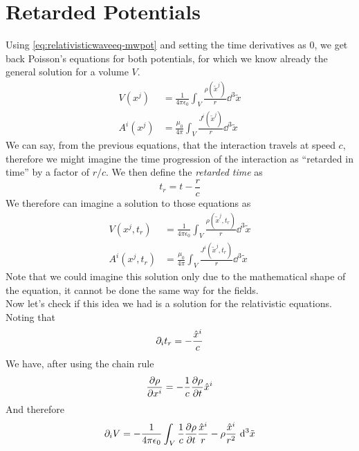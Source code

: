 \documentclass[../electromagnetism.tex]{subfiles}
\begin{document}
\section{Retarded Potentials}
Using \eqref{eq:relativisticwaveeq-mwpot} and setting the time derivatives as 0, we get back Poisson's equations for both potentials, for which we know already the general solution for a volume $V$.
\begin{equation*}
	\begin{aligned}
		V(x^j)&=\frac{1}{4\pi\epsilon_0}\int_{V}^{}\frac{\rho(\tilde{x}^j)}{r}\dd^3{\tilde{x}}\\
		A^i(x^j)&=\frac{\mu_0}{4\pi}\int_{V}^{}\frac{J^i(\tilde{x}^j)}{r}\dd^3{\tilde{x}}
	\end{aligned}
\end{equation*}
We can say, from the previous equations, that the interaction travels at speed $c$, therefore we might imagine the time progression of the interaction as ``retarded in time'' by a factor of $r/c$. We then define the \textit{retarded time} as
\begin{equation}
	t_r=t-\frac{r}{c}
	\label{eq:retardedtime}
\end{equation}
We therefore can imagine a solution to those equations as 
\begin{equation}
	\begin{aligned}
		V(x^j,t_r)&=\frac{1}{4\pi\epsilon_0}\int_{V}^{}\frac{\rho(\tilde{x}^j,t_r)}{r}\dd^3{\tilde{x}}\\
		A^i(x^j,t_r)&=\frac{\mu_0}{4\pi}\int_{V}^{}\frac{J^i(\tilde{x}^j,t_r)}{r}\dd^3{\tilde{x}}
	\end{aligned}
	\label{eq:retardedsolution}
\end{equation}
Note that we could imagine this solution only due to the mathematical shape of the equation, it cannot be done the same way for the fields.\\
Now let's check if this idea we had is a solution for the relativistic equations. Noting that
\begin{equation*}
	\partial_it_r=-\frac{\hat{x}^i}{c}
\end{equation*}
We have, after using the chain rule
\begin{equation*}
	\pdv{\rho}{x^i}=-\frac{1}{c}\pdv{\rho}{t}\hat{x}^i
\end{equation*}
And therefore
\begin{equation*}
	\partial_iV=-\frac{1}{4\pi\epsilon_0}\int_{V}^{}\frac{1}{c}\pdv{\rho}{t}\frac{\hat{x}^i}{r}-\rho\frac{\hat{x}^i}{r^2}\ \mathrm{d}^3{\tilde{x}}
\end{equation*}
\end{document}
